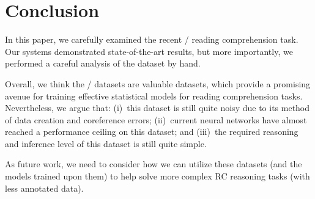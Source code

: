 \section{Conclusion}

In this paper, we carefully examined the recent \slash {} reading comprehension task. Our systems demonstrated state-of-the-art results, but more importantly, we performed a careful analysis of the dataset by hand.

Overall, we think the \slash {} datasets are valuable datasets, which provide a promising avenue for training effective statistical models for reading comprehension tasks. Nevertheless, we argue that: (i)~this dataset is still quite noisy due to its method of data creation and coreference errors; (ii)~current neural networks have almost reached a performance ceiling on this dataset; and (iii)~the required reasoning and inference level of this dataset is still quite simple.

As future work, we need to consider how we can utilize these datasets (and the models trained upon them) to help solve more complex RC reasoning tasks (with less annotated data).
